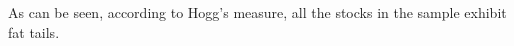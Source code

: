 \documentclass[12pt,a4paper]{amsart}
\begin{document}
As can be seen, according to Hogg's measure, all the stocks in the sample exhibit fat tails. 



%
%
%
\end{document}
